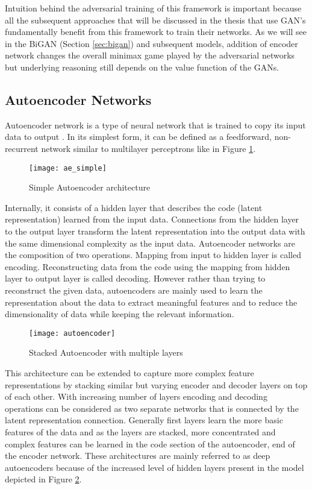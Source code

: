 Intuition behind the adversarial training of this framework is important because all the subsequent
approaches that will be discussed in the thesis that use GAN's fundamentally benefit from this
framework to train their networks. As we will see in the BiGAN (Section \ref{sec:bigan}) and subsequent models, addition of
encoder network changes the overall minimax game played by the adversarial networks but underlying
reasoning still depends on the value function of the GANs.

\subsection{Autoencoder Networks}
\label{sec:ae}
 
Autoencoder network is a type of neural network that is trained to copy its input data to output
\cite{Goodfellow-et-al-2016}. In its simplest form, it can be defined as a feedforward, 
non-recurrent network similar to multilayer perceptrons like in Figure \ref{fig:ae_simple}.
\begin{figure}[h!]
	\centering
	\texttt{[image: ae\_simple]}
    \caption{Simple Autoencoder architecture}
    \label{fig:ae_simple}
\end{figure}

Internally, it consists of a hidden layer that describes the code (latent representation) 
learned from the input data. Connections from the hidden layer to the output layer transform
the latent representation into the output data with the same dimensional complexity as the input 
data. Autoencoder networks are the composition of two operations. Mapping from input to hidden layer is called encoding. 
Reconstructing data from the code using the mapping from hidden layer to output layer is called 
decoding. However rather than trying to reconstruct the given data, autoencoders are mainly used 
to learn the representation about the data to extract meaningful features and to reduce the 
dimensionality of data while keeping the relevant information.

\begin{figure}[h!]
	\centering
	\texttt{[image: autoencoder]}
    \caption{Stacked Autoencoder with multiple layers}
    \label{fig:ae_deep}
\end{figure}

This architecture can be extended to capture more
complex feature representations by stacking similar but varying encoder and decoder layers on top of
each other. With increasing number of layers encoding and decoding operations can be considered as two separate 
networks that is connected by the latent representation connection. Generally first layers learn the more basic features 
of the data and as the layers are stacked, more concentrated and complex features can be learned in the code section 
of the autoencoder, end of the encoder network. These architectures are mainly referred to as deep
autoencoders because of the increased level of hidden layers present in the model depicted in Figure
\ref{fig:ae_deep}.

